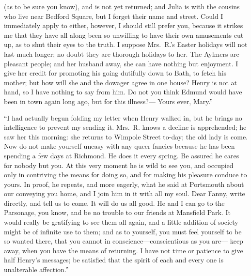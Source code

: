 (as to be sure you know), and is not yet returned;
and Julia is with the cousins who live near Bedford Square,
but I forget their name and street.  Could I immediately
apply to either, however, I should still prefer you,
because it strikes me that they have all along been so
unwilling to have their own amusements cut up, as to shut
their eyes to the truth.  I suppose Mrs.\ R.'s Easter
holidays will not last much longer; no doubt they are
thorough holidays to her.  The Aylmers are pleasant people;
and her husband away, she can have nothing but enjoyment.
I give her credit for promoting his going dutifully down
to Bath, to fetch his mother; but how will she and the
dowager agree in one house?  Henry is not at hand, so I
have nothing to say from him.  Do not you think Edmund would
have been in town again long ago, but for this illness?---%
Yours ever, Mary.''

``I had actually begun folding my letter when Henry walked in,
but he brings no intelligence to prevent my sending it.
Mrs.\ R. knows a decline is apprehended; he saw her this morning:
she returns to Wimpole Street to-day; the old lady is come.
Now do not make yourself uneasy with any queer fancies
because he has been spending a few days at Richmond.
He does it every spring.  Be assured he cares for nobody
but you.  At this very moment he is wild to see you,
and occupied only in contriving the means for doing so,
and for making his pleasure conduce to yours.  In proof,
he repeats, and more eagerly, what he said at Portsmouth
about our conveying you home, and I join him in it with all
my soul.  Dear Fanny, write directly, and tell us to come.
It will do us all good.  He and I can go to the Parsonage,
you know, and be no trouble to our friends at Mansfield Park.
It would really be gratifying to see them all again, and a
little addition of society might be of infinite use to them;
and as to yourself, you must feel yourself to be so wanted there,
that you cannot in conscience---conscientious as you are---%
keep away, when you have the means of returning.
I have not time or patience to give half Henry's messages;
be satisfied that the spirit of each and every one is
unalterable affection.''

